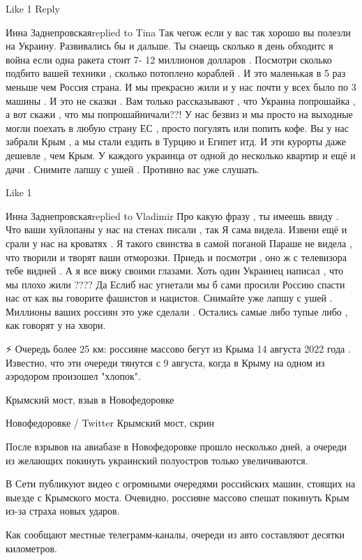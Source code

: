 {    Like 1
    Reply


Инна Заднепровскаяreplied to Tina
Так чегож если у вас так хорошо вы полезли на Украину. Развивались бы и дальше. Ты снаещь сколько в день обходитс я война если одна ракета стоит 7- 12 миллионов долларов . Посмотри сколько подбито вашей техники , сколько потоплено кораблей . И это маленькая в 5 раз меньше чем Россия страна. И мы прекрасно жили и у нас почти у всех было по 3 машины . И это не сказки . Вам только рассказывают , что Украина попрошайка , а вот скажи , что мы попрошайничали??! У нас безвиз и мы просто на выходные могли поехать в любую страну ЕС , просто погулять или попить кофе. Вы у нас забрали Крым , а мы стали ездить в Турцию и Египет итд. И эти курорты даже дешевле , чем Крым. У каждого украинца от одной до несколько квартир и ещё и дачи . Снимите лапшу с ушей . Противно вас уже слушать.

    Like 1

Инна Заднепровскаяreplied to Vladimir
Про какую фразу , ты имеешь ввиду . Что ваши хуйлопаны у нас на стенах писали , так Я сама видела. Извени ещё и срали у нас на кроватях . Я такого свинства в самой поганой Параше не видела , что творили и творят ваши отморозки. Приедь и посмотри , оно ж с телевизора тебе видней . А я все вижу своими глазами. Хоть один Украинец написал , что мы плохо жили ???? Да Еслиб нас угнетали мы б сами просили Россию спасти нас от как вы говорите фашистов и нацистов. Снимайте уже лапшу с ушей . Миллионы ваших россиян это уже сделали . Остались самые либо тупые либо , как говорят у на хвори.


⚡️ Очередь более 25 км: россияне массово бегут из Крыма 14 августа 2022 года .
Известно, что эти очереди тянутся с 9 августа, когда в Крыму на одном из
аэродором произошел "хлопок".

Крымский мост, взыв в Новофедоровке

Новофедоровке / Twitter Крымский мост, скрин

После взрывов на авиабазе в Новофедоровке прошло несколько дней, а очереди из
желающих покинуть украинский полуостров только увеличиваются.

В Сети публикуют видео с огромными очередями российских машин, стоящих на
выезде с Крымского моста. Очевидно, россияне массово спешат покинуть Крым из-за
страха новых ударов.

Как сообщают местные телеграмм-каналы, очереди из авто составляют десятки
километров.

}
